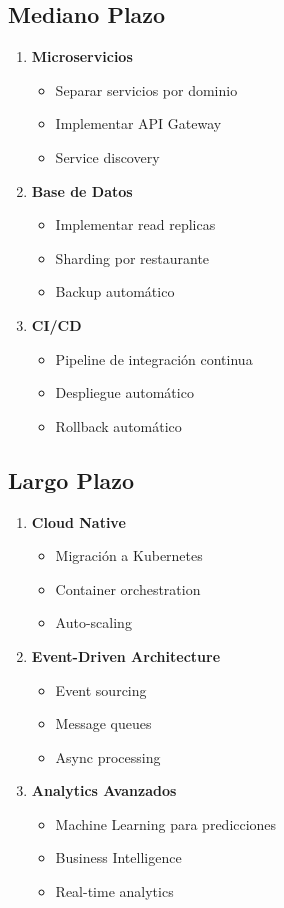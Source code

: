 \documentclass[12pt,a4paper]{article}
\begin{document}
\subsection{Mediano Plazo}
\begin{enumerate}
    \item \textbf{Microservicios}
    \begin{itemize}
        \item Separar servicios por dominio
        \item Implementar API Gateway
        \item Service discovery
    \end{itemize}
    
    \item \textbf{Base de Datos}
    \begin{itemize}
        \item Implementar read replicas
        \item Sharding por restaurante
        \item Backup automático
    \end{itemize}
    
    \item \textbf{CI/CD}
    \begin{itemize}
        \item Pipeline de integración continua
        \item Despliegue automático
        \item Rollback automático
    \end{itemize}
\end{enumerate}

\subsection{Largo Plazo}
\begin{enumerate}
    \item \textbf{Cloud Native}
    \begin{itemize}
        \item Migración a Kubernetes
        \item Container orchestration
        \item Auto-scaling
    \end{itemize}
    
    \item \textbf{Event-Driven Architecture}
    \begin{itemize}
        \item Event sourcing
        \item Message queues
        \item Async processing
    \end{itemize}
    
    \item \textbf{Analytics Avanzados}
    \begin{itemize}
        \item Machine Learning para predicciones
        \item Business Intelligence
        \item Real-time analytics
    \end{itemize}
\end{enumerate}
\end{document}
